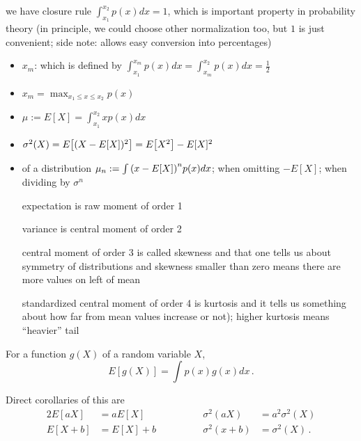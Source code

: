 we have closure rule $\int_{x_1}^{x_2} p(x) dx = 1$, which is important property in probability theory (in principle, we could choose other normalization too, but $1$ is just convenient; side note: allows easy conversion into percentages)



\begin{defi}%
\begin{itemize}
\item {} $x_m$: which is defined by $\int_{x_1}^{x_m} p(x) dx = \int_{x_m}^{x_2} p(x) dx = \frac{1}{2}$


\item {} $x_m = \max_{x_1 \leq x \leq x_2} p(x)$


\item {} $\mu := E[X] = \int_{x_1}^{x_2} x p(x) dx$


\item {} $\sigma^2(X) = E\qty[(X - E[X])^2] = E\qty[X^2] - E[X]^2$


\item {} of a distribution $\mu_n := \int \qty(x - E[X])^n p(x) dx$;  when omitting $- E[X]$;  when dividing by $\sigma^n$

expectation is raw moment of order 1

variance is central moment of order 2

central moment of order 3 is called skewness and that one tells us about symmetry of distributions and skewness smaller than zero means there are more values on left of mean

standardized central moment of order 4 is kurtosis and it tells us something about how far from mean values increase or not); higher kurtosis means \enquote{heavier} tail
\end{itemize}
\end{defi}


\begin{prop}
For a function $g(X)$ of a random variable $X$, 
\begin{equation}\label{eq:law_unconscious}
E[g(X)] = \int p(x) g(x) dx \, .
\end{equation}

Direct corollaries of this are
\begin{alignat*}{2}
E[a X] &= a E[X] & \sigma^2(a X) &= a^2 \sigma^2(X)
\\
E[X + b] &= E[X] + b \qquad \qquad & \sigma^2(x + b) &= \sigma^2(X) \, .
\end{alignat*}
\end{prop}


